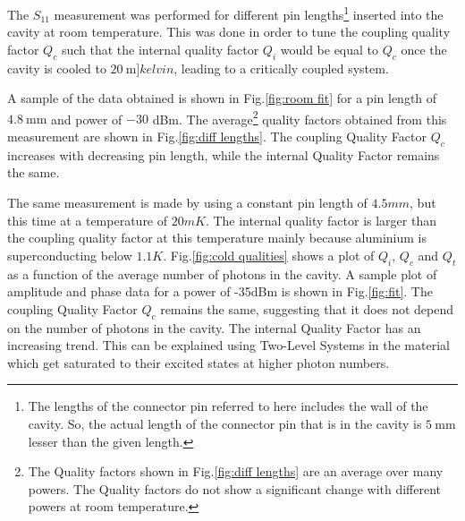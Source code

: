 The $S_{11}$ measurement was performed for different pin lengths\footnote{The lengths of the connector pin referred to here includes the wall of the cavity. So, the actual length of the connector pin that is in the cavity is $\SI{5}{\milli\meter}$ lesser than the given length.} inserted into the cavity at room temperature. This was done in order to tune the coupling quality factor $Q_c$ such that the internal quality factor $Q_i$ would be equal to $Q_c$ once the cavity is cooled to $\SI{20}{\milli]kelvin}$, leading to a critically coupled system.

A sample of the data obtained is shown in Fig.\ref{fig:room fit} for a pin length of $\SI{4.8}{\milli\meter}$ and power of $-30$ dBm. The average\footnote{The Quality factors shown in Fig.\ref{fig:diff lengths} are an average over many powers. The Quality factors do not show a significant change with different powers at room temperature.} quality factors obtained from this measurement are shown in Fig.\ref{fig:diff lengths}. The coupling Quality Factor $Q_c$ increases with decreasing pin length, while the internal Quality Factor remains the same.

The same measurement is made by using a constant pin length of $4.5 mm$, but this time at a temperature of $20mK$. The internal quality factor is larger than the coupling quality factor at this temperature mainly because aluminium is superconducting below $1.1K$. Fig.\ref{fig:cold qualities} shows a plot of $Q_i$, $Q_c$ and $Q_t$ as a function of the average number of photons in the cavity. A sample plot of amplitude and phase data for a power of -35dBm is shown in Fig.\ref{fig:fit}. The coupling Quality Factor $Q_c$ remains the same, suggesting that it does not depend on the number of photons in the cavity. The internal Quality Factor has an increasing trend. This can be explained using Two-Level Systems in the material which get saturated to their excited states at higher photon numbers\cite{Gao2007}.

